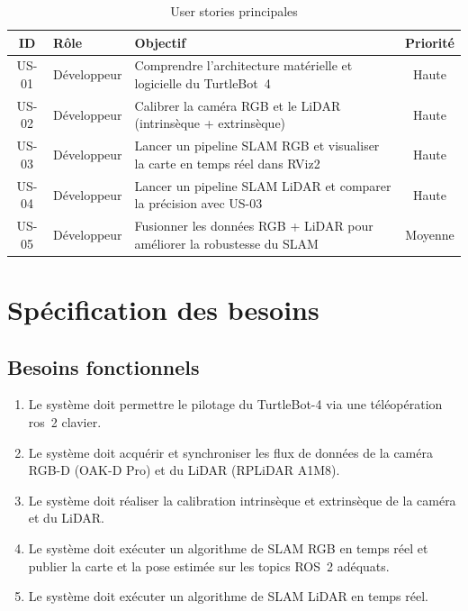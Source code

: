\documentclass[12pt,a4paper]{report}
\begin{document}
\begin{table}[H]
  \centering
  \caption{User stories principales}\label{tab:user_stories}
  \renewcommand{\arraystretch}{1.4}
  \begin{tabularx}{\textwidth}{c l X c}
    \toprule
    \textbf{ID} & \textbf{Rôle} & \textbf{Objectif}                                                 & \textbf{Priorité} \\
    \midrule
    US-01       & Développeur   & Comprendre l'architecture matérielle et logicielle du TurtleBot~4
                & Haute                                                                                                 \\
    US-02       & Développeur   & Calibrer la caméra RGB et le LiDAR (intrinsèque +
    extrinsèque)
                & Haute                                                                                                 \\
    US-03       & Développeur   & Lancer un pipeline SLAM RGB et visualiser la carte en
    temps réel dans RViz2
                & Haute                                                                                                 \\
    US-04       & Développeur   & Lancer un pipeline SLAM LiDAR et comparer la précision
    avec US-03
                & Haute                                                                                                 \\
    US-05       & Développeur   & Fusionner les données RGB + LiDAR pour améliorer la
    robustesse du SLAM
                & Moyenne                                                                                               \\
    \bottomrule
  \end{tabularx}
\end{table}

\chapter{Spécification des besoins}

\section{Besoins fonctionnels}

\begin{enumerate}[label=\textbf{BF-\arabic*}]
  \item Le système doit permettre le pilotage du TurtleBot-4 via une téléopération
        \acrshort{ros}~2 clavier.
  \item Le système doit acquérir et synchroniser les flux de données de la caméra RGB-D
        (OAK-D Pro) et du LiDAR (RPLiDAR A1M8).
  \item Le système doit réaliser la calibration intrinsèque et extrinsèque de la caméra
        et du LiDAR.\@
  \item Le système doit exécuter un algorithme de SLAM RGB en temps réel et publier la
        carte et la pose estimée sur les topics ROS~2 adéquats.
  \item Le système doit exécuter un algorithme de SLAM LiDAR en temps réel.
\end{enumerate}
\end{document}
